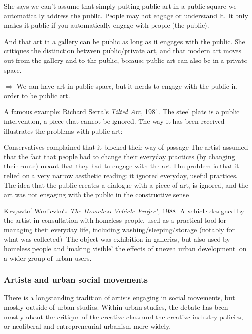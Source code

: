 \documentclass{article}
\begin{document}
She says we can't assume that simply putting public art in a public square we automatically address the public. People may not engage or understand it. It only makes it public if you automatically engage with people (the public). 

And that art in a gallery can be public as long as it engages with the public. She critiques the distinction between public/private art, and that modern art moves out from the gallery and to the public, because public art can also be in a private space. 

$\Rightarrow$ We can have art in public space, but it needs to engage with the public in order to be public art.

A famous example: Richard Serra's \textit{Tilted Arc}, 1981. The steel plate is a public intervention, a piece that cannot be ignored. The way it has been received illustrates the problems with public art:

\begin{outline}
	\1 Conservatives complained that it blocked their way of passage
	\1 The artist assumed that the fact that people had to change their everyday practices (by changing their route) meant that they had to engage with the art
	\1 The problem is that it relied on a very narrow aesthetic reading: it ignored everyday, useful practices. The idea that the public creates a dialogue with a piece of art, is ignored, and the art was not engaging with the public in the constructive sense
\end{outline}

Krzysztof Wodiczko's \textit{The Homeless Vehicle Project}, 1988. A vehicle designed by the artist in consultation with homeless people, used as a practical tool for managing their everyday life, including washing/sleeping/storage (notably for what was collected). The object was exhibition in galleries, but also used by homeless people and `making visible' the effects of uneven urban development, on a wider group of urban users.

\subsubsection{Artists and urban social movements}

There is a longstanding tradition of artists engaging in social movements, but mostly outside of urban studies. 
Within urban studies, the debate has been mostly about the critique of the creative class and the creative industry policies, or neoliberal and entrepreneurial urbanism more widely.
\end{document}
